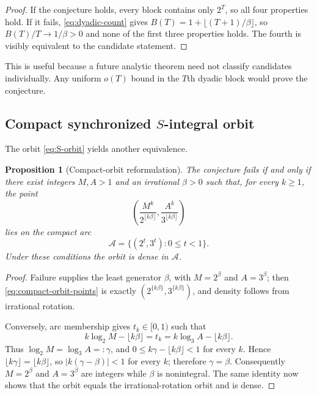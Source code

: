 \documentclass[11pt,oneside]{article}
\newtheorem{proposition}[theorem]{Proposition}
\theoremstyle{definition}
\theoremstyle{remark}
\begin{document}
\begin{proof}
If the conjecture holds, every block contains only $2^T$, so all four properties hold.  If it
fails, \eqref{eq:dyadic-count} gives
$B(T)=1+\lfloor(T+1)/\beta\rfloor$, so $B(T)/T\to1/\beta>0$ and none of the first three
properties holds.  The fourth is visibly equivalent to the candidate statement.
\end{proof}

This is useful because a future analytic theorem need not classify candidates individually.
Any uniform $o(T)$ bound in the $T$th dyadic block would prove the conjecture.

\subsection{Compact synchronized $S$-integral orbit}

The orbit \eqref{eq:S-orbit} yields another equivalence.

\begin{proposition}[Compact-orbit reformulation]
\label{prop:compact-orbit}
The conjecture fails if and only if there exist integers $M,A>1$ and an irrational
$\beta>0$ such that, for every $k\ge1$, the point
\begin{equation}
 \left(
  \frac{M^k}{2^{\lfloor k\beta\rfloor}},
  \frac{A^k}{3^{\lfloor k\beta\rfloor}}
 \right)
 \label{eq:compact-orbit-points}
\end{equation}
lies on the compact arc
\[
 \mathcal A=\{(2^t,3^t):0\le t<1\}.
\]
Under these conditions the orbit is dense in $\mathcal A$.
\end{proposition}

\begin{proof}
Failure supplies the least generator $\beta$, with $M=2^\beta$ and $A=3^\beta$; then
\eqref{eq:compact-orbit-points} is exactly $(2^{\{k\beta\}},3^{\{k\beta\}})$, and density
follows from irrational rotation.

Conversely, arc membership gives $t_k\in[0,1)$ such that
\[
 k\log_2M-\lfloor k\beta\rfloor=t_k
 =k\log_3A-\lfloor k\beta\rfloor.
\]
Thus $\log_2M=\log_3A=:\gamma$, and
$0\le k\gamma-\lfloor k\beta\rfloor<1$ for every $k$.  Hence
$\lfloor k\gamma\rfloor=\lfloor k\beta\rfloor$, so
$|k(\gamma-\beta)|<1$ for every $k$; therefore $\gamma=\beta$.  Consequently
$M=2^\beta$ and $A=3^\beta$ are integers while $\beta$ is nonintegral.  The same identity now
shows that the orbit equals the irrational-rotation orbit and is dense.
\end{proof}
\end{document}
